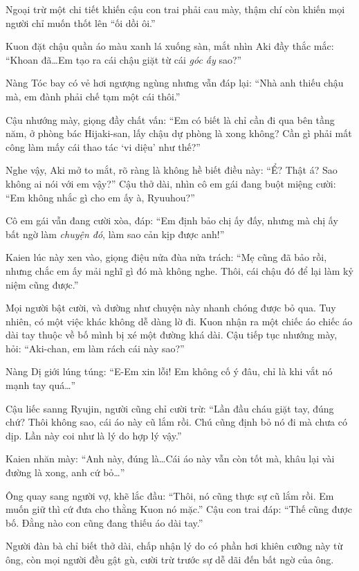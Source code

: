 \documentclass[../main.tex]{subfiles}
\begin{document}
Ngoại trừ một chi tiết khiến cậu con trai phải cau mày, thậm chí còn khiến mọi người chỉ muốn thốt lên ``ối dồi ôi.''

Kuon đặt chậu quần áo màu xanh lá xuống sàn, mắt nhìn Aki đầy thắc mắc: ``Khoan đã\dots Em tạo ra cái chậu giặt từ cái \emph{góc ấy} sao?''

Nàng Tóc bay có vẻ hơi ngượng ngùng nhưng vẫn đáp lại: ``Nhà anh thiếu chậu mà, em đành phải chế tạm một cái thôi.''

Cậu nhướng mày, giọng đầy chất vấn: ``Em có biết là chỉ cần đi qua bên tầng năm, ở phòng bác Hijaki-san, lấy chậu dự phòng là xong không? Cần gì phải mất công làm mấy cái thao tác `vi diệu' như thế?''

Nghe vậy, Aki mở to mắt, rõ ràng là không hề biết điều này: ``Ể? Thật á? Sao không ai nói với em vậy?'' Cậu thở dài, nhìn cô em gái đang buột miệng cười: ``Em không nhắc gì cho em ấy à, Ryuuhou?''

Cô em gái vẫn đang cười xòa, đáp: ``Em định bảo chị ấy đấy, nhưng mà chị ấy bất ngờ làm \emph{chuyện đó}, làm sao cản kịp được anh!''

Kaien lúc này xen vào, giọng điệu nửa đùa nửa trách: ``Mẹ cũng đã bảo rồi, nhưng chắc em ấy mải nghĩ gì đó mà không nghe. Thôi, cái chậu đó để lại làm kỷ niệm cũng được.''

Mọi người bật cười, và dường như chuyện này nhanh chóng được bỏ qua. Tuy nhiên, có một việc khác không dễ dàng lờ đi. Kuon nhận ra một chiếc áo chiếc áo dài tay thuộc về bố mình bị xé một đường khá dài. Cậu tiếp tục nhướng mày, hỏi: ``Aki-chan, em làm rách cái này sao?''

Nàng Dị giới lúng túng: ``E-Em xin lỗi! Em không cố ý đâu, chỉ là khi vắt nó mạnh tay quá\dots''

Cậu liếc sanng Ryujin, người cũng chỉ cười trừ: ``Lần đầu cháu giặt tay, đúng chứ? Thôi không sao, cái áo này cũ lắm rồi. Chú cũng định bỏ nó đi mà chưa có dịp. Lần này coi như là lý do hợp lý vậy.''

Kaien nhăn mày: ``Anh này, đúng là\dots Cái áo này vẫn còn tốt mà, khâu lại vài đường là xong, anh cứ bỏ\dots''

Ông quay sang người vợ, khẽ lắc đầu: ``Thôi, nó cũng thực sự cũ lắm rồi. Em muốn giữ thì cứ đưa cho thằng Kuon nó mặc.'' Cậu con trai đáp: ``Thế cũng được bố. Đằng nào con cũng đang thiếu áo dài tay.''

Người đàn bà chỉ biết thở dài, chấp nhận lý do có phần hơi khiên cưỡng này từ ông, còn mọi người đều gật gù, cười trừ trước sự dễ dãi đến bất ngờ của ông.
\end{document}
